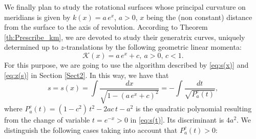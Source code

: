 \documentclass[leqno,11pt]{amsart}
\theoremstyle{definition}
\numberwithin{equation}{section}
\begin{document}
We finally plan to study the rotational surfaces whose principal curvature on meridians is given by $k(x)=a\, e^x$, $a >0$, $x$ being the (non constant) distance from the surface to the axis of revolution. According to Theorem \ref{th:Prescribe_km}, we are devoted to study their generatrix curves, uniquely determined up to $z$-translations by the following geometric linear momenta:
\begin{equation}\label{eq:K exp}
	\mathcal K (x)=a \, e^x+c, \ a>0, \,  c<1.
\end{equation}
For this purpose, we are going to use the algorithm described by \eqref{eq:s(x)} and \eqref{eq:z(s)} in Section \ref{Sect2}. In this way, we have that
\begin{equation}\label{eq:s(t)}
	s=s(x)=\int \frac{dx}{\sqrt{1-(a \, e^x+c)^2}}=-\int \frac{dt}{\sqrt{P_a^c(t)}}, 
\end{equation}
where $ P_a^c(t)=(1-c^2)\, t^2 -2ac\, t-a^2 $ is the quadratic polynomial resulting from the change of variable  $t=e^{-x}>0$ in \eqref{eq:s(t)}. Its discriminant is $4a^2$. We distinguish the following cases taking into account that $ P_a^c(t)>0$:
\end{document}

